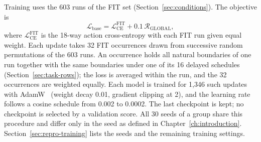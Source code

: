 Training uses the 603 runs of the FIT set
(Section~\ref{sec:conditions}). The objective is
\begin{equation}
  \mathcal{L}_{\mathrm{base}}
  = \mathcal{L}^{\mathrm{FIT}}_{\mathrm{CE}}
  + 0.1\,\mathcal{R}_{\mathrm{GLOBAL}},
  \label{eq:base-loss}
\end{equation}
where $\mathcal{L}^{\mathrm{FIT}}_{\mathrm{CE}}$ is the 18-way action
cross-entropy with each FIT run given equal weight. Each update takes
32 FIT occurrences drawn from successive random permutations of the 603
runs. An occurrence holds all natural boundaries of one run together
with the same boundaries under one of its 16 delayed schedules
(Section~\ref{sec:task-rows}); the loss is averaged within the run,
and the 32 occurrences are weighted equally. Each model is
trained for 1,346 such updates with AdamW~\cite{loshchilov2017decoupled}
(weight decay 0.01, gradient clipping at 2), and the learning rate
follows a cosine schedule from 0.002 to 0.0002. The last checkpoint is
kept; no checkpoint is selected by a validation score. All 30 seeds of
a group share this procedure and differ only in the seed as
defined in Chapter~\ref{ch:introduction}. Section~\ref{sec:repro-training} lists the seeds and the remaining
training settings.


